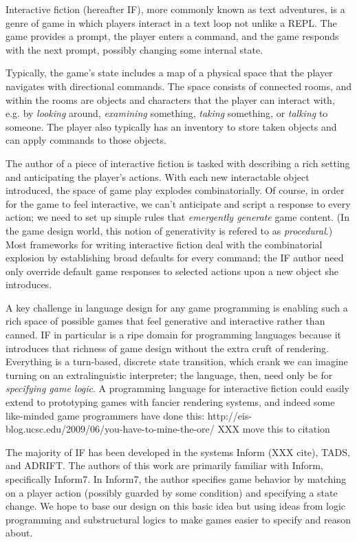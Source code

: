 Interactive fiction (hereafter IF), more commonly known as text adventures,
is a genre of game in which players interact in a text loop not unlike a
REPL. The game provides a prompt, the player enters a command, and the game
responds with the next prompt, possibly changing some internal state.

Typically, the game's state includes a map of a physical space that the
player navigates with directional commands. The space consists of connected
rooms, and within the rooms are objects and characters that the player can
interact with, e.g. by {\em looking} around, {\em examining} something, 
{\em taking} something, or {\em talking} to someone. The player also
typically has an inventory to store taken objects and can apply commands to
those objects.

The author of a piece of interactive fiction is tasked with describing a
rich setting and anticipating the player's actions.  With each new
interactable object introduced, the space of game play explodes
combinatorially. Of course, in order for the game to feel interactive, we
can't anticipate and script a response to every action; we need to set up
simple rules that {\em emergently generate} game content.  (In the game
design world, this notion of generativity is refered to as {\em
procedural}.) Most frameworks for writing interactive fiction deal with the
combinatorial explosion by establishing broad defaults for every command;
the IF author need only override default game responses to selected actions
upon a new object she introduces.

A key challenge in language design for any game programming is enabling
such a rich space of possible games that feel generative and interactive
rather than canned.  IF in particular is a ripe domain for programming
languages because it introduces that richness of game design
without the extra cruft of rendering. Everything is a turn-based, discrete
state transition, which crank we can imagine turning on an extralinguistic
interpreter; the language, then, need only be for {\em specifying game
logic}. A programming language for interactive fiction could easily extend
to prototyping games with fancier rendering systems, and indeed some
like-minded game programmers have done this:
http://eis-blog.ucsc.edu/2009/06/you-have-to-mine-the-ore/
XXX move this to citation

The majority of IF has been developed in the systems Inform (XXX cite), TADS,
and ADRIFT. The authors of this work are primarily familiar with Inform,
specifically Inform7. In Inform7, the author specifies game behavior by
matching on a player action (possibly guarded by some condition) and
specifying a state change. We hope to base our design on this basic idea
but using ideas from logic programming and substructural logics to make
games easier to specify and reason about.

